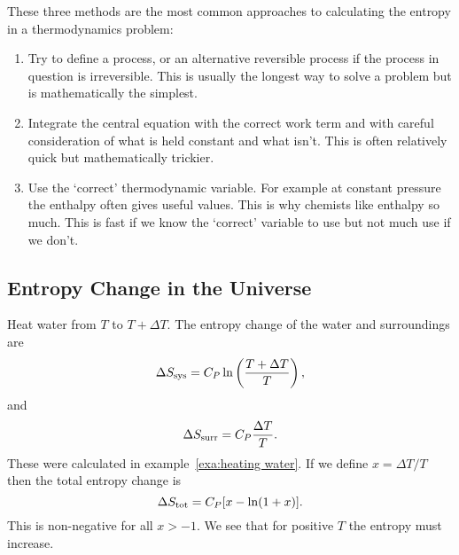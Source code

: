     These three methods are the most common approaches to calculating the entropy in a thermodynamics problem:
    \begin{enumerate}
        \item Try to define a process, or an alternative reversible process if the process in question is irreversible.
        This is usually the longest way to solve a problem but is mathematically the simplest.
        \item Integrate the central equation with the correct work term and with careful consideration of what is held constant and what isn't.
        This is often relatively quick but mathematically trickier.
        \item Use the `correct' thermodynamic variable.
        For example at constant pressure the enthalpy often gives useful values.
        This is why chemists like enthalpy so much.
        This is fast if we know the `correct' variable to use but not much use if we don't.
    \end{enumerate}
    
    \subsection{Entropy Change in the Universe}
    Heat water from \(T\) to \(T + \Delta T\).
    The entropy change of the water and surroundings are
    \[\Delta S_{\mathrm{sys}} = C_P \ln\left(\frac{T + \Delta T}{T}\right),\]
    and
    \[\Delta S_{\mathrm{surr}} = C_P\frac{\Delta T}{T}.\]
    These were calculated in example~\ref{exa:heating water}.
    If we define \(x = \Delta T/T\) then the total entropy change is
    \[\Delta S_{\mathrm{tot}} = C_P[x - \ln(1 + x)].\]
    This is non-negative for all \(x > -1\).
    We see that for positive \(T\) the entropy must increase.
    
